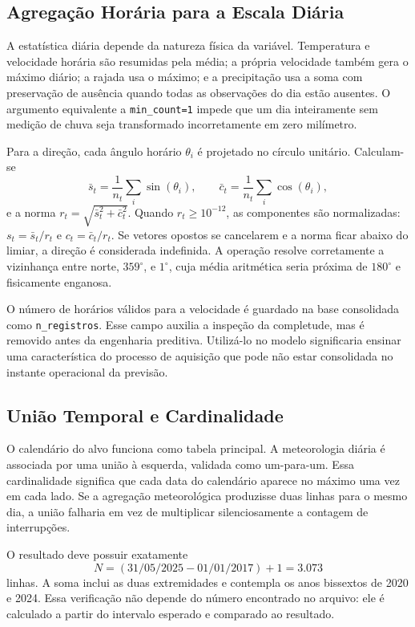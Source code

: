 \subsection{Agregação Horária para a Escala Diária}

A estatística diária depende da natureza física da variável. Temperatura e velocidade horária são resumidas pela média; a própria velocidade também gera o máximo diário; a rajada usa o máximo; e a precipitação usa a soma com preservação de ausência quando todas as observações do dia estão ausentes. O argumento equivalente a \texttt{min\_count=1} impede que um dia inteiramente sem medição de chuva seja transformado incorretamente em zero milímetro.

Para a direção, cada ângulo horário $\theta_i$ é projetado no círculo unitário. Calculam-se
\begin{equation}
    \bar{s}_t=\frac{1}{n_t}\sum_i\sin(\theta_i), \qquad
    \bar{c}_t=\frac{1}{n_t}\sum_i\cos(\theta_i),
\end{equation}
e a norma $r_t=\sqrt{\bar{s}_t^2+\bar{c}_t^2}$. Quando $r_t\geq10^{-12}$, as componentes são normalizadas: $s_t=\bar{s}_t/r_t$ e $c_t=\bar{c}_t/r_t$. Se vetores opostos se cancelarem e a norma ficar abaixo do limiar, a direção é considerada indefinida. A operação resolve corretamente a vizinhança entre norte, $359^\circ$, e $1^\circ$, cuja média aritmética seria próxima de $180^\circ$ e fisicamente enganosa.

O número de horários válidos para a velocidade é guardado na base consolidada como \texttt{n\_registros}. Esse campo auxilia a inspeção da completude, mas é removido antes da engenharia preditiva. Utilizá-lo no modelo significaria ensinar uma característica do processo de aquisição que pode não estar consolidada no instante operacional da previsão.

\subsection{União Temporal e Cardinalidade}

O calendário do alvo funciona como tabela principal. A meteorologia diária é associada por uma união à esquerda, validada como um-para-um. Essa cardinalidade significa que cada data do calendário aparece no máximo uma vez em cada lado. Se a agregação meteorológica produzisse duas linhas para o mesmo dia, a união falharia em vez de multiplicar silenciosamente a contagem de interrupções.

O resultado deve possuir exatamente
\begin{equation}
    N=(\text{31/05/2025}-\text{01/01/2017})+1=3.073
\end{equation}
linhas. A soma inclui as duas extremidades e contempla os anos bissextos de 2020 e 2024. Essa verificação não depende do número encontrado no arquivo: ele é calculado a partir do intervalo esperado e comparado ao resultado.


